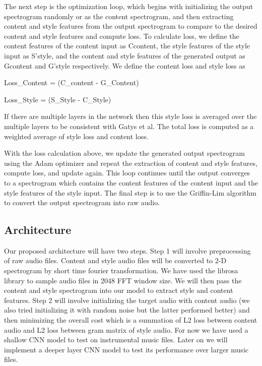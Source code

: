 \documentclass[10pt,twocolumn,letterpaper]{article}
\begin{document}
The next step is the optimization loop, which begins with initializing the output spectrogram randomly or as the content spectrogram, and then extracting content and style features from the output spectrogram to compare to the desired content and style features and compute loss. To calculate loss, we define the content features of the content input as Ccontent, the style features of the style input as S'style, and the content and style features of the generated output as Gcontent and G'style respectively. We define the content loss  and style loss as

Loss_Content = (C_content - G_Content)

Loss_Style = (S_Style - C_Style)
 
If there are multiple layers in the network then this style loss is averaged over the multiple layers to be consistent with Gatys et al. The total loss is computed as a weighted average of style loss and content loss.

With the loss calculation above, we update the generated output spectrogram using the Adam optimizer \cite{Authors00008}and repeat the extraction of content and style features, compute loss, and update again. This loop continues until the output converges to a spectrogram which contains the content features of the content input and the style features of the style input. The final step is to use the Griffin-Lim algorithm\cite{Authors00004} to convert the output spectrogram into raw audio.

\subsection{Architecture}
Our proposed architecture will have two steps. Step 1 will involve preprocessing of raw audio files. Content and style audio files will be converted to 2-D spectrogram by short time fourier transformation. We have used the librosa library to sample audio files in 2048 FFT window size.
We will then pass the content and style spectrogram into our model to extract style and content features. Step 2 will involve initializing the target audio with content audio (we also tried initializing it with random noise but the latter performed better) and then minimizing the overall cost which is a summation of L2 loss between content audio and L2 loss between gram matrix of style audio. For now we have used a shallow CNN model to test on instrumental music files. Later on we will implement a deeper layer CNN model to test its performance over larger music files.
\end{document}
